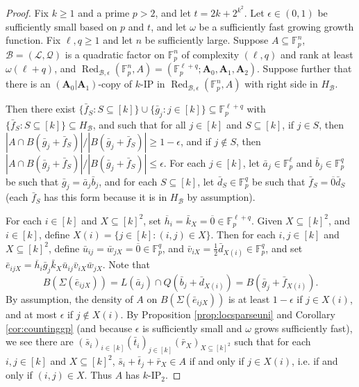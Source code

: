 \documentclass[12pt,oneside,british,a4wide]{amsart}
\numberwithin{equation}{section}
\theoremstyle{definition}
\def\F{\mathbb{F}}
\def\IP{\mathrm{IP}}
\def\e{\epsilon}
\newcommand{\abar}{\bar{a}}
\newcommand{\bbar}{\bar{b}}
\newcommand{\dbar}{\bar{d}}
\newcommand{\ebar}{\bar{e}}
\newcommand{\fbar}{\bar{f}}
\newcommand{\gbar}{\bar{g}}
\newcommand{\kbar}{\bar{k}}
\newcommand{\rbar}{\bar{r}}
\newcommand{\sbar}{\bar{s}}
\newcommand{\tbar}{\bar{t}}
\newcommand{\ubar}{\bar{u}}
\newcommand{\vbar}{\bar{v}}
\newcommand{\wbar}{\bar{w}}
\newcommand{\calL}{\mathcal{L}}
\newcommand{\calB}{\mathcal{B}}
\newcommand{\calQ}{\mathcal{Q}}
\newcommand{\Red}{{\mathrm{Red}}}
\def\Red{\operatorname{Red}}
\begin{document}
\begin{proof}
Fix $k\geq 1$ and a prime $p>2$, and let $t=2k+2^{k^2}$. Let $\e\in (0,1)$ be sufficiently small based on $p$ and $t$,  and let $\omega$ be a sufficiently fast growing growth function. Fix $\ell, q\geq 1$ and let $n$ be sufficiently large.  Suppose $A\subseteq \mathbb{F}_p^n$,  $\calB=(\calL,\calQ)$ is a quadratic factor on $\F_p^n$ of complexity $(\ell,q)$ and rank at least $\omega(\ell+q)$, and $\Red_{\calB,\e}(\F_p^n,A)=(\F_p^{\ell+q};\mathbf{A}_0,\mathbf{A}_1,\mathbf{A}_2)$. Suppose further that there is an $(\mathbf{A}_0|\mathbf{A}_1)$-copy of $k$-$\IP$ in $\Red_{\calB,\e}(\F_p^n,A)$ with right side in $H_{\calB}$.  

Then there exist $\{\fbar_S:S\subseteq [k]\}\cup \{\gbar_j: j\in [k]\}\subseteq \F_p^{\ell+q}$ with $\{\fbar_S:S\subseteq  [k]\}\subseteq H_{\calB}$, and such that for all $j\in [k]$ and $S\subseteq [k]$, if $j\in S$, then $|A\cap B(\gbar_j+\fbar_S)|/|B(\gbar_j+\fbar_S)|\geq 1-\e$, and if $j\notin S$, then $|A\cap B(\gbar_j+\fbar_S)|/|B(\gbar_j+\fbar_S)|\leq \e$.  For each $j\in [k]$, let $\abar_j\in \F_p^{\ell}$ and $\bbar_j\in \F_p^q$ be such that $\gbar_j=\abar_j \bbar_j$, and for each $S\subseteq [k]$, let $\dbar_S\in \F_p^q$ be such that $\fbar_S=\overline{0} \dbar_S$ (each $\fbar_S$ has this form because it is in $H_{\calB}$ by assumption).
 
For each $i\in [k]$ and $X\subseteq [k]^2$, set $\overline{h}_i=\kbar_X=\overline{0}\in \F_p^{\ell+q}$.   Given $X\subseteq [k]^2$, and $i\in [k]$, define $X(i)=\{j\in [k]: (i,j)\in X\}$.  Then for each $i,j\in [k]$ and $X\subseteq[k]^2$, define $\ubar_{ij}=\wbar_{jX}=\overline{0}\in \F_p^q$, and $\vbar_{iX}=\frac{1}{2}\dbar_{X(i)}\in \F_p^q$, and set $\ebar_{ijX}=\overline{h}_i \gbar_j \kbar_{X}\ubar_{ij}\vbar_{iX}\wbar_{jX}$.  Note that 
\[B(\Sigma(\ebar_{ijX}))=L(\abar_{j})\cap Q(\bbar_j+\dbar_{X(i)})=B(\gbar_j+\fbar_{X(i)}).\]
By assumption, the density of $A$ on $B(\Sigma(\ebar_{ijX}))$ is at least $1-\e$ if $j\in X(i)$, and at most $\e$ if $j\notin X(i)$.  By Proposition \ref{prop:locsparseuni} and Corollary \ref{cor:countinggp} (and because $\e$ is sufficiently small and $\omega$ grows sufficiently fast), we see there are $(\sbar_i)_{i\in [k]}(\tbar_i)_{j\in [k]}(\rbar_X)_{X\subseteq [k]^2}$  such that for each $i,j\in [k]$ and $X\subseteq [k]^2$, $\sbar_i+\tbar_j+\rbar_X\in A$ if and only if $j\in X(i)$, i.e. if and only if $(i,j)\in X$.  Thus $A$ has $k$-$\IP_2$.
\end{proof}
\end{document}
